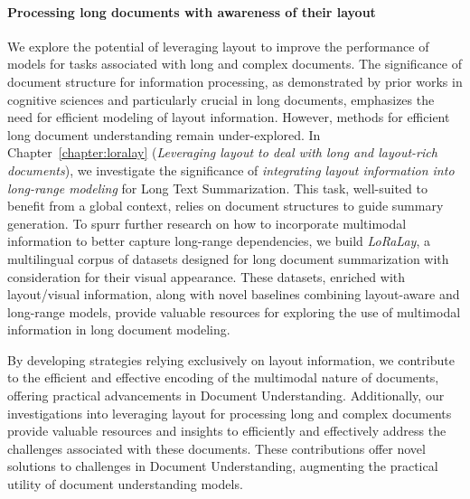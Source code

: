 \paragraph{Processing long documents with awareness of their layout} 
We explore the potential of leveraging layout to improve the performance of models for tasks associated with long and complex documents. The significance of document structure for information processing, as demonstrated by prior works in cognitive sciences and particularly crucial in long documents, emphasizes the need for efficient modeling of layout information. However, methods for efficient long document understanding remain under-explored. In Chapter~\ref{chapter:loralay} (\textit{Leveraging layout to deal with long and layout-rich documents}), we investigate the significance of \textit{integrating layout information into long-range modeling} for Long Text Summarization. This task, well-suited to benefit from a global context, relies on document structures to guide summary generation. To spurr further research on how to incorporate multimodal information to better capture long-range dependencies, we build \textit{LoRaLay}, a multilingual corpus of datasets designed for long document summarization with consideration for their visual appearance. These datasets, enriched with layout/visual information, along with novel baselines combining layout-aware and long-range models, provide valuable resources for exploring the use of multimodal information in long document modeling. 

By developing strategies relying exclusively on layout information, we contribute to the efficient and effective encoding of the multimodal nature of documents, offering practical advancements in Document Understanding. Additionally, our investigations into leveraging layout for processing long and complex documents provide valuable resources and insights to efficiently and effectively address the challenges associated with these documents. These contributions offer novel solutions to challenges in Document Understanding, augmenting the practical utility of document understanding models.


